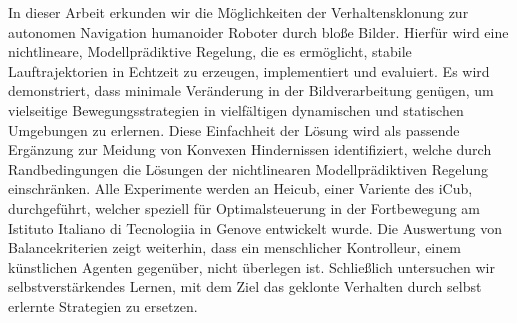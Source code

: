 In dieser Arbeit erkunden wir die Möglichkeiten der Verhaltensklonung zur autonomen Navigation humanoider Roboter durch bloße Bilder. Hierfür wird eine nichtlineare, Modellprädiktive Regelung, die es ermöglicht, stabile Lauftrajektorien in Echtzeit zu erzeugen, implementiert und evaluiert. Es wird demonstriert, dass minimale Veränderung in der Bildverarbeitung genügen, um vielseitige Bewegungsstrategien in vielfältigen dynamischen und statischen Umgebungen zu erlernen. Diese Einfachheit der Lösung wird als passende Ergänzung zur Meidung von Konvexen Hindernissen identifiziert, welche durch Randbedingungen die Lösungen der nichtlinearen Modellprädiktiven Regelung einschränken. Alle Experimente werden an Heicub, einer Variente des iCub, durchgeführt, welcher speziell für Optimalsteuerung in der Fortbewegung am Istituto Italiano di Tecnologiia in Genove entwickelt wurde. Die Auswertung von Balancekriterien zeigt weiterhin, dass ein menschlicher Kontrolleur, einem künstlichen Agenten gegenüber, nicht überlegen ist. Schließlich untersuchen wir selbstverstärkendes Lernen, mit dem Ziel das geklonte Verhalten durch selbst erlernte Strategien zu ersetzen.
